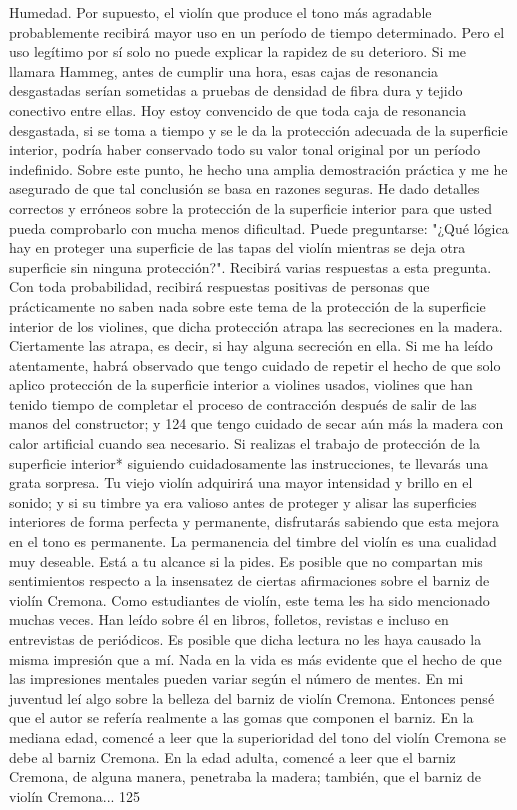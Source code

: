 Humedad. Por supuesto, el violín que produce el tono más agradable probablemente recibirá mayor uso en un período de tiempo determinado. Pero el uso legítimo por sí solo no puede explicar la rapidez de su deterioro. Si me llamara Hammeg, antes de cumplir una hora, esas cajas de resonancia desgastadas serían sometidas a pruebas de densidad de fibra dura y tejido conectivo entre ellas.
Hoy estoy convencido de que toda caja de resonancia desgastada, si se toma a tiempo y se le da la protección adecuada de la superficie interior, podría haber conservado todo su valor tonal original por un período indefinido. Sobre este punto, he hecho una amplia demostración práctica y me he asegurado de que tal conclusión se basa en razones seguras. He dado detalles correctos y erróneos sobre la protección de la superficie interior para que usted pueda comprobarlo con mucha menos dificultad. Puede preguntarse: "¿Qué lógica hay en proteger una superficie de las tapas del violín mientras se deja otra superficie sin ninguna protección?". Recibirá varias respuestas a esta pregunta. Con toda probabilidad, recibirá respuestas positivas de personas que prácticamente no saben nada sobre este tema de la protección de la superficie interior de los violines, que dicha protección atrapa las secreciones en la madera. Ciertamente las atrapa, es decir, si hay alguna secreción en ella. Si me ha leído atentamente, habrá observado que tengo cuidado de repetir el hecho de que solo aplico protección de la superficie interior a violines usados, violines que han tenido tiempo de completar el proceso de contracción después de salir de las manos del constructor; y
124
\label{barniz_cremona}
que tengo cuidado de secar aún más la madera con calor artificial cuando sea necesario.
Si realizas el trabajo de protección de la superficie interior* siguiendo cuidadosamente las instrucciones, te llevarás una grata sorpresa. Tu viejo violín adquirirá una mayor intensidad y brillo en el sonido; y si su timbre ya era valioso antes de proteger y alisar las superficies interiores de forma perfecta y permanente, disfrutarás sabiendo que esta mejora en el tono es permanente.
La permanencia del timbre del violín es una cualidad muy deseable. Está a tu alcance si la pides.
Es posible que no compartan mis sentimientos respecto a la insensatez de ciertas afirmaciones sobre el barniz de violín Cremona. Como estudiantes de violín, este tema les ha sido mencionado muchas veces. Han leído sobre él en libros, folletos, revistas e incluso en entrevistas de periódicos. Es posible que dicha lectura no les haya causado la misma impresión que a mí. Nada en la vida es más evidente que el hecho de que las impresiones mentales pueden variar según el número de mentes. En mi juventud leí algo sobre la belleza del barniz de violín Cremona. Entonces pensé que el autor se refería realmente a las gomas que componen el barniz. En la mediana edad, comencé a leer que la superioridad del tono del violín Cremona se debe al barniz Cremona. En la edad adulta, comencé a leer que el barniz Cremona, de alguna manera, penetraba la madera; también, que el barniz de violín Cremona...
125

